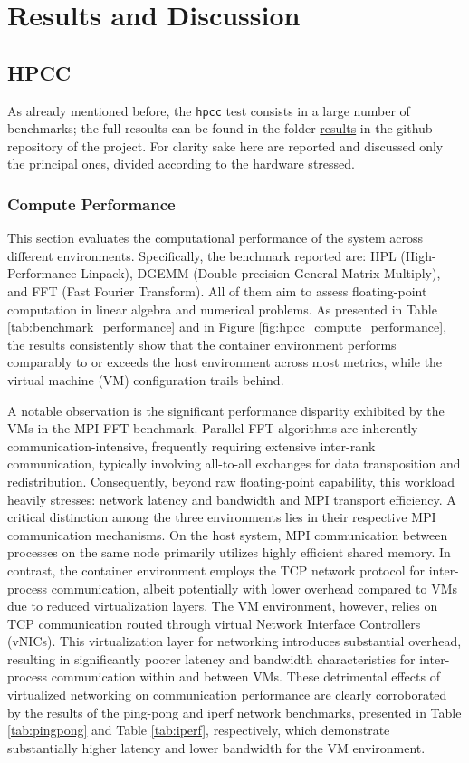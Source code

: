 \section{Results and Discussion}

\subsection{HPCC}

As already mentioned before, the \texttt{hpcc} test consists in a large number of benchmarks; the full resoults can be found in the folder \href{https://github.com/giovanni-lucarelli/cloud-basic/tree/main/results}{results} in the github repository of the project. For clarity sake here are reported and discussed only the principal ones, divided according to the hardware stressed.

\subsubsection{Compute Performance}

This section evaluates the computational performance of the system across different environments. Specifically, the benchmark reported are: HPL (High-Performance Linpack), DGEMM (Double-precision General Matrix Multiply), and FFT (Fast Fourier Transform). All of them aim to assess floating-point computation in linear algebra and numerical problems. As presented in Table \ref{tab:benchmark_performance} and in Figure \ref{fig:hpcc_compute_performance}, the results consistently show that the container environment performs comparably to or exceeds the host environment across most metrics, while the virtual machine (VM) configuration trails behind.

A notable observation is the significant performance disparity exhibited by the VMs in the MPI FFT benchmark. Parallel FFT algorithms are inherently communication-intensive, frequently requiring extensive inter-rank communication, typically involving all-to-all exchanges for data transposition and redistribution. Consequently, beyond raw floating-point capability, this workload heavily stresses: network latency and bandwidth and MPI transport efficiency. A critical distinction among the three environments lies in their respective MPI communication mechanisms. On the host system, MPI communication between processes on the same node primarily utilizes highly efficient shared memory. In contrast, the container environment employs the TCP network protocol for inter-process communication, albeit potentially with lower overhead compared to VMs due to reduced virtualization layers. The VM environment, however, relies on TCP communication routed through virtual Network Interface Controllers (vNICs). This virtualization layer for networking introduces substantial overhead, resulting in significantly poorer latency and bandwidth characteristics for inter-process communication within and between VMs. These detrimental effects of virtualized networking on communication performance are clearly corroborated by the results of the ping-pong and iperf network benchmarks, presented in Table \ref{tab:pingpong} and Table \ref{tab:iperf}, respectively, which demonstrate substantially higher latency and lower bandwidth for the VM environment.

